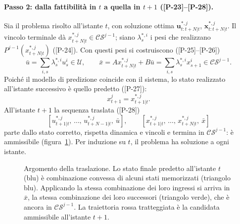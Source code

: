 \documentclass[11pt,a4paper]{article}
\theoremstyle{definition}
\theoremstyle{plain}
\theoremstyle{remark}
\newcommand{\Uc}{\mathcal{U}}
\newcommand{\CS}{\mathcal{CS}}
\newcommand{\eqp}[1]{\textup{[P-#1]}}   %
\newcommand{\vett}[1]{\mathbf{#1}}
\begin{document}
\paragraph{Passo 2: dalla fattibilità in $t$ a quella in $t+1$ (\eqp{23}--\eqp{28}).}
Sia il problema risolto all'istante $t$, con soluzione ottima
$\vett{u}^{*,j}_{t:t+N|t}$, $\vett{x}^{*,j}_{t:t+N|t}$. Il vincolo terminale dà
$x^{*,j}_{t+N|t}\in\CS^{j-1}$; siano $\lambda^{*,i}_s$ i pesi che realizzano
$P^{j-1}(x^{*,j}_{t+N|t})$ (\eqp{24}). Con questi pesi si costruiscono
(\eqp{25}--\eqp{26})
\[
  \bar u = \sum_{i,s}\lambda^{*,i}_s u^i_s\in\Uc,\qquad
  \bar x = Ax^{*,j}_{t+N|t}+B\bar u = \sum_{i,s}\lambda^{*,i}_s x^i_{s+1}\in\CS^{j-1}.
\]
Poiché il modello di predizione coincide con il sistema, lo stato realizzato
all'istante successivo è quello predetto (\eqp{27}):
\begin{equation}\label{eq:modello-esatto}
  x^j_{t+1} = x^{*,j}_{t+1|t}.
\end{equation}
All'istante $t+1$ la sequenza traslata (\eqp{28})
\[
  [u^{*,j}_{t+1|t},\,\dots,\,u^{*,j}_{t+N-1|t},\ \bar u],\qquad
  [x^{*,j}_{t+1|t},\,\dots,\,x^{*,j}_{t+N|t},\ \bar x]
\]
parte dallo stato corretto, rispetta dinamica e vincoli e termina in
$\CS^{j-1}$: è ammissibile (figura~\ref{fig:traslazione}). Per induzione su
$t$, il problema ha soluzione a ogni istante.

\begin{figure}[h]
\centering
{}
\caption{Argomento della traslazione. Lo stato finale predetto all'istante $t$
(blu) è combinazione convessa di alcuni stati memorizzati (triangolo blu).
Applicando la stessa combinazione dei loro ingressi si arriva in $\bar x$, la
stessa combinazione dei loro successori (triangolo verde), che è ancora in
$\CS^{j-1}$. La traiettoria rossa tratteggiata è la candidata ammissibile
all'istante $t+1$.}
\label{fig:traslazione}
\end{figure}
\end{document}
